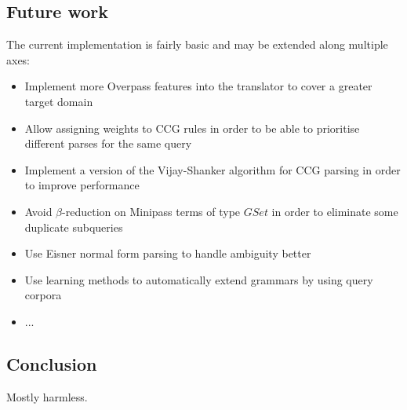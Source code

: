 \documentclass[main.tex]{subfiles}
\begin{document}
\subsection{Future work}
The current implementation is fairly basic and may be extended along multiple
axes:

\begin{itemize}
    \item Implement more Overpass features into the translator to cover a greater
        target domain
    \item Allow assigning weights to CCG rules in order to be able to prioritise
        different parses for the same query
    \item Implement a version of the Vijay-Shanker algorithm for CCG parsing
        in order to improve performance
    \item Avoid $\beta$-reduction on Minipass terms of type $GSet$ in order
        to eliminate some duplicate subqueries
    \item Use Eisner normal form parsing to handle ambiguity better
    \item Use learning methods to automatically extend grammars by using
        query corpora
    \item ...
\end{itemize}

\subsection{Conclusion}
Mostly harmless.
\end{document}
